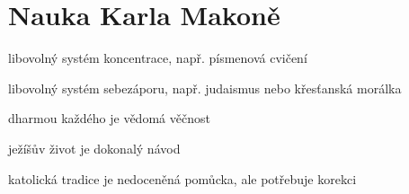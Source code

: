 \chapter{Nauka Karla Makoně}

libovolný systém koncentrace, např. písmenová cvičení

libovolný systém sebezáporu, např. judaismus nebo křesťanská morálka

dharmou každého je vědomá věčnost

ježíšův život je dokonalý návod

katolická tradice je nedoceněná pomůcka, ale potřebuje korekci
